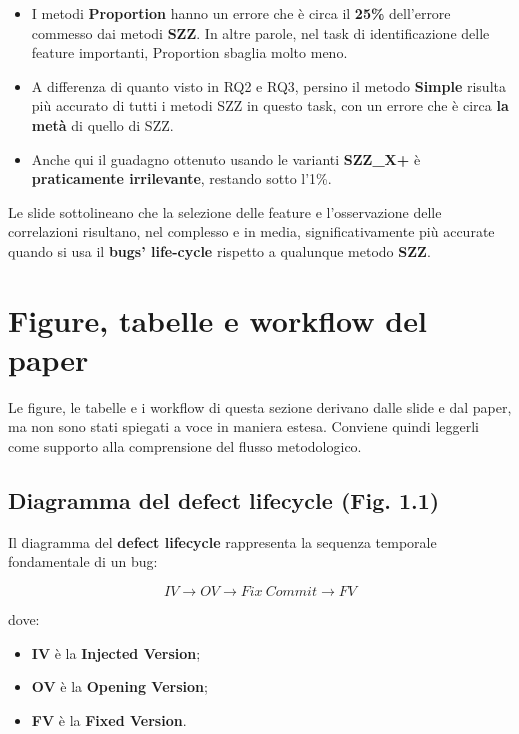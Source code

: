 \begin{itemize}
    \item I metodi \textbf{Proportion} hanno un errore che è circa il \textbf{25\%} dell'errore commesso dai metodi \textbf{SZZ}. In altre parole, nel task di identificazione delle feature importanti, Proportion sbaglia molto meno.
    \item A differenza di quanto visto in RQ2 e RQ3, persino il metodo \textbf{Simple} risulta più accurato di tutti i metodi SZZ in questo task, con un errore che è circa \textbf{la metà} di quello di SZZ.
    \item Anche qui il guadagno ottenuto usando le varianti \textbf{SZZ\_X+} è \textbf{praticamente irrilevante}, restando sotto l'1\%.
\end{itemize}

\begin{notaslide}
Le slide sottolineano che la selezione delle feature e l'osservazione delle correlazioni risultano, nel complesso e in media, significativamente più accurate quando si usa il \textbf{bugs' life-cycle} rispetto a qualunque metodo \textbf{SZZ}.
\end{notaslide}

\section{Figure, tabelle e workflow del paper}

\begin{notaslide}
Le figure, le tabelle e i workflow di questa sezione derivano dalle slide e dal paper, ma non sono stati spiegati a voce in maniera estesa. Conviene quindi leggerli come supporto alla comprensione del flusso metodologico.
\end{notaslide}

\subsection{Diagramma del defect lifecycle (Fig. 1.1)}

Il diagramma del \textbf{defect lifecycle} rappresenta la sequenza temporale fondamentale di un bug:

\[
IV \rightarrow OV \rightarrow Fix\ Commit \rightarrow FV
\]

dove:

\begin{itemize}
    \item \textbf{IV} è la \textbf{Injected Version};
    \item \textbf{OV} è la \textbf{Opening Version};
    \item \textbf{FV} è la \textbf{Fixed Version}.
\end{itemize}

